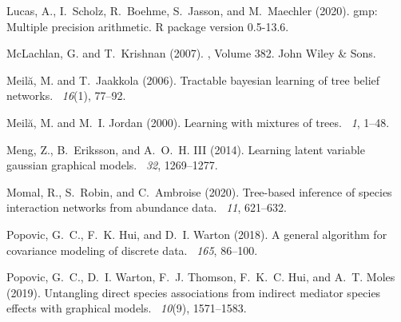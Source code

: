 \documentclass{article}                     %
\begin{document}
\begin{thebibliography}{}
Lucas, A., I.~Scholz, R.~Boehme, S.~Jasson, and M.~Maechler (2020).
\newblock gmp: Multiple precision arithmetic.
\newblock R package version 0.5-13.6.

McLachlan, G. and T.~Krishnan (2007).
, Volume 382.
\newblock John Wiley \& Sons.

Meil{\u{a}}, M. and T.~Jaakkola (2006).
\newblock Tractable bayesian learning of tree belief networks.
~{\em 16\/}(1), 77--92.

Meil{\u{a}}, M. and M.~I. Jordan (2000).
\newblock Learning with mixtures of trees.
~{\em 1}, 1--48.

Meng, Z., B.~Eriksson, and A.~O.~H. III (2014).
\newblock Learning latent variable gaussian graphical models.
~{\em 32}, 1269--1277.

Momal, R., S.~Robin, and C.~Ambroise (2020).
\newblock Tree-based inference of species interaction networks from abundance
  data.
~{\em 11}, 621--632.

Popovic, G.~C., F.~K. Hui, and D.~I. Warton (2018).
\newblock A general algorithm for covariance modeling of discrete data.
~{\em 165}, 86--100.

Popovic, G.~C., D.~I. Warton, F.~J. Thomson, F.~K.~C. Hui, and A.~T. Moles
  (2019).
\newblock Untangling direct species associations from indirect mediator species
  effects with graphical models.
~{\em 10\/}(9), 1571--1583.


\end{thebibliography}
\end{document}
